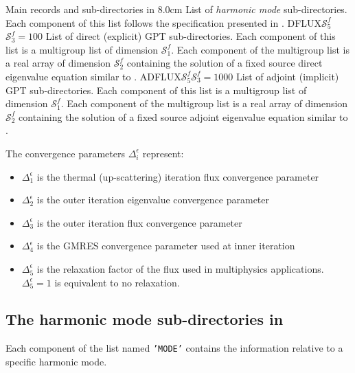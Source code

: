 \begin{DescriptionEnregistrement}{Main records and sub-directories in }{8.0cm}
  {List of {\sl harmonic mode} sub-directories. Each component of this list follows
  the specification presented in .}
\OptDirlEnr
  {DFLUX}{$\mathcal{S}^{f}_{5}$}{$\mathcal{S}^{f}_{3}=100$}
  {List of direct (explicit) GPT sub-directories. Each component of this list is a multigroup list of
  dimension $\mathcal{S}^{f}_{1}$. Each component of the multigroup list is a real array of dimension
  $\mathcal{S}^{f}_{2}$ containing the solution of a fixed source direct eigenvalue equation similar to .}
\OptDirlEnr
  {ADFLUX}{$\mathcal{S}^{f}_{5}$}{$\mathcal{S}^{f}_{3}=1000$}
  {List of adjoint (implicit) GPT sub-directories. Each component of this list is a multigroup list of
  dimension $\mathcal{S}^{f}_{1}$. Each component of the multigroup list is a real array of dimension
  $\mathcal{S}^{f}_{2}$ containing the solution of a fixed source adjoint eigenvalue equation similar to .}
\end{DescriptionEnregistrement}

The convergence parameters $\Delta_i^\epsilon$ represent:
\begin{itemize}
\item $\Delta_1^\epsilon$ is the thermal (up-scattering) iteration flux convergence parameter
\item $\Delta_2^\epsilon$ is the outer iteration eigenvalue convergence parameter
\item $\Delta_3^\epsilon$ is the outer iteration flux convergence parameter
\item $\Delta_4^\epsilon$ is the GMRES convergence parameter used at inner iteration
\item $\Delta_5^\epsilon$ is the relaxation factor of the flux used in multiphysics applications. $\Delta_5^\epsilon=1$ is equivalent to no
relaxation.
\end{itemize}
\goodbreak

\subsection{The harmonic mode sub-directories in }\label{sect:mode_spec}

Each component of the list named {\tt 'MODE'} contains the information relative to a specific
harmonic mode.

